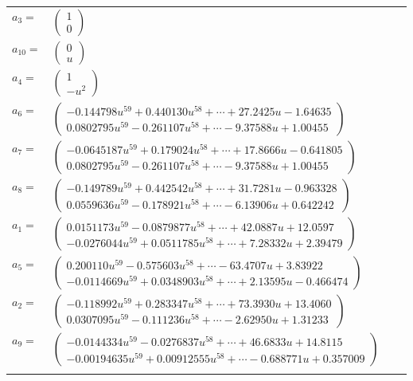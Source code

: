 \documentclass[1p]{elsarticle_modified}
\theoremstyle{definition}
\begin{document}
\begin{tabular}{m{7pt} m{180pt} m{7pt} m{180pt} }
\flushright $a_{3}=$&$\begin{pmatrix}1\\0\end{pmatrix}$ \\
\flushright $a_{10}=$&$\begin{pmatrix}0\\u\end{pmatrix}$ \\
\flushright $a_{4}=$&$\begin{pmatrix}1\\- u^2\end{pmatrix}$ \\
\flushright $a_{6}=$&$\begin{pmatrix}-0.144798 u^{59}+0.440130 u^{58}+\cdots+27.2425 u-1.64635\\0.0802795 u^{59}-0.261107 u^{58}+\cdots-9.37588 u+1.00455\end{pmatrix}$ \\
\flushright $a_{7}=$&$\begin{pmatrix}-0.0645187 u^{59}+0.179024 u^{58}+\cdots+17.8666 u-0.641805\\0.0802795 u^{59}-0.261107 u^{58}+\cdots-9.37588 u+1.00455\end{pmatrix}$ \\
\flushright $a_{8}=$&$\begin{pmatrix}-0.149789 u^{59}+0.442542 u^{58}+\cdots+31.7281 u-0.963328\\0.0559636 u^{59}-0.178921 u^{58}+\cdots-6.13906 u+0.642242\end{pmatrix}$ \\
\flushright $a_{1}=$&$\begin{pmatrix}0.0151173 u^{59}-0.0879877 u^{58}+\cdots+42.0887 u+12.0597\\-0.0276044 u^{59}+0.0511785 u^{58}+\cdots+7.28332 u+2.39479\end{pmatrix}$ \\
\flushright $a_{5}=$&$\begin{pmatrix}0.200110 u^{59}-0.575603 u^{58}+\cdots-63.4707 u+3.83922\\-0.0114669 u^{59}+0.0348903 u^{58}+\cdots+2.13595 u-0.466474\end{pmatrix}$ \\
\flushright $a_{2}=$&$\begin{pmatrix}-0.118992 u^{59}+0.283347 u^{58}+\cdots+73.3930 u+13.4060\\0.0307095 u^{59}-0.111236 u^{58}+\cdots-2.62950 u+1.31233\end{pmatrix}$ \\
\flushright $a_{9}=$&$\begin{pmatrix}-0.0144334 u^{59}-0.0276837 u^{58}+\cdots+46.6833 u+14.8115\\-0.00194635 u^{59}+0.00912555 u^{58}+\cdots-0.688771 u+0.357009\end{pmatrix}$\\&\end{tabular}
\end{document}
